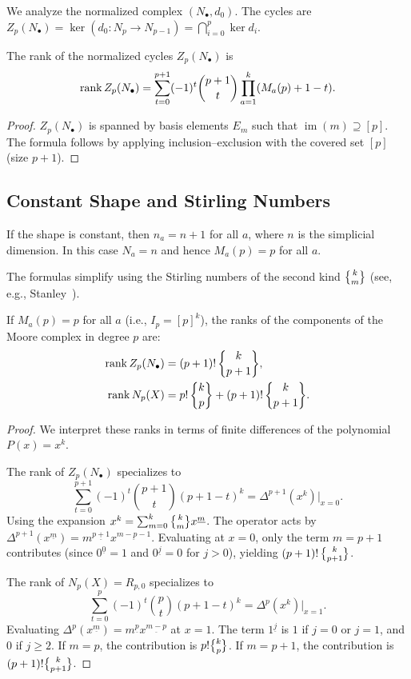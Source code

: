 We analyze the normalized complex $(N_\bullet, d_0)$. The cycles are $Z_p(N_\bullet) = \ker(d_0: N_p \to N_{p-1}) = \bigcap_{i=0}^p \ker d_i$.

\begin{corollary}\label{cor:rank-Zp}
The rank of the normalized cycles $Z_p(N_\bullet)$ is
\[
\operatorname{rank} Z_p(N_\bullet) = \sum_{t=0}^{p+1}(-1)^t\binom{p+1}{t}\prod_{a=1}^k(M_a(p)+1-t).
\]
\end{corollary}

\begin{proof}
$Z_p(N_\bullet)$ is spanned by basis elements $E_m$ such that $\operatorname{im}(m) \supseteq [p]$. The formula follows by applying inclusion--exclusion with the covered set $[p]$ (size $p+1$).
\end{proof}


\subsection{Constant Shape and Stirling Numbers}

If the shape is constant, then $n_a = n+1$ for all $a$, where $n$ is the
simplicial dimension. In this case $N_a = n$ and hence $M_a(p) = p$ for all $a$.

The formulas simplify using the Stirling numbers of the second kind
$\StirlingII{k}{m}$ (see, e.g., Stanley~\cite{StanleyEC1}).


\begin{theorem}\label{thm:Stirling}
If $M_a(p)=p$ for all $a$ (i.e., $I_p=[p]^k$), the ranks of the components of the Moore complex in degree $p$ are:
\begin{align*}
\rank Z_p(N_\bullet) &= (p+1)!\,\StirlingII{k}{p+1}, \\
\rank N_p(X) &= p!\,\StirlingII{k}{p} + (p+1)!\,\StirlingII{k}{p+1}.
\end{align*}
\end{theorem}

\begin{proof}
We interpret these ranks in terms of finite differences of the polynomial $P(x)=x^k$.

The rank of $Z_p(N_\bullet)$ specializes to
\[
\sum_{t=0}^{p+1}(-1)^t\binom{p+1}{t}(p+1-t)^k = \Delta^{p+1}(x^k)\big|_{x=0}.
\]
Using the expansion $x^k=\sum_{m=0}^{k}\StirlingII{k}{m}x^{\underline m}$.
The operator acts by $\Delta^{p+1}(x^{\underline m}) = m^{\underline{p+1}} x^{\underline{m-p-1}}$. 
Evaluating at $x=0$, only the term $m=p+1$ contributes (since $0^{\underline 0}=1$ and $0^{\underline{j}}=0$ for $j>0$), yielding $(p+1)!\,\StirlingII{k}{p+1}$.

The rank of $N_p(X) = R_{p,0}$ specializes to
\[
\sum_{t=0}^{p}(-1)^t\binom{p}{t}(p+1-t)^k = \Delta^{p}(x^k)\big|_{x=1}.
\]
Evaluating $\Delta^{p}(x^{\underline m}) = m^{\underline p} x^{\underline{m-p}}$ at $x=1$. The term $1^{\underline{j}}$ is $1$ if $j=0$ or $j=1$, and $0$ if $j\ge 2$.
If $m=p$, the contribution is $p! \StirlingII{k}{p}$.
If $m=p+1$, the contribution is $(p+1)! \StirlingII{k}{p+1}$.
\end{proof}

